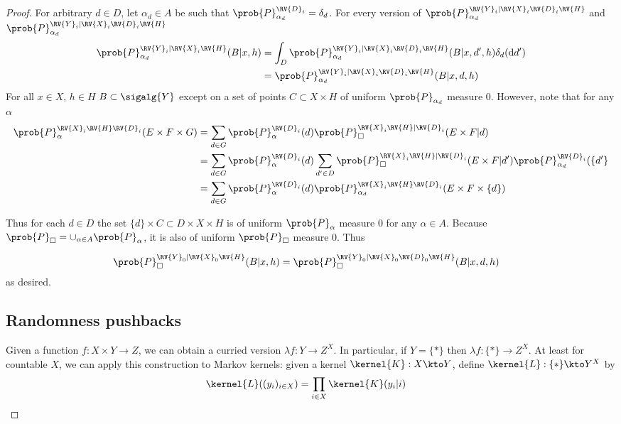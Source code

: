 \begin{proof}
For arbitrary $d\in D$, let $\alpha_d\in A$ be such that $\prob{P}_{\alpha_d}^{\RV{D}_i}=\delta_{d}$. For every version of $\prob{P}_{\alpha_d}^{\RV{Y}_i|\RV{X}_i\RV{D}_i\RV{H}}$ and $\prob{P}_{\alpha_d}^{\RV{Y}_i|\RV{X}_i\RV{D}_i\RV{H}}$
\begin{align}
    \prob{P}_{\alpha_d}^{\RV{Y}_i|\RV{X}_i\RV{H}}(B|x,h) &= \int_{D}\prob{P}_{\alpha_d}^{\RV{Y}_i|\RV{X}_i\RV{D}_i\RV{H}}(B|x,d',h)\delta_d(\mathrm{d}d')\\
                                                         &= \prob{P}_{\alpha_d}^{\RV{Y}_i|\RV{X}_i\RV{D}_i\RV{H}}(B|x,d,h)
\end{align}
For all $x\in X$, $h\in H$ $B\subset\sigalg{Y}$ except on a set of points $C\subset X\times H$ of uniform $\prob{P}_{\alpha_d}$ measure 0.
However, note that for any $\alpha$
\begin{align}
    \prob{P}_\alpha^{\RV{X}_i\RV{H}\RV{D}_i}(E\times F\times G) &= \sum_{d\in G} \prob{P}_\alpha^{\RV{D}_i}(d)\prob{P}_\square^{\RV{X}_i\RV{H}|\RV{D}_i}(E\times F|d)\\
                                                                  &= \sum_{d\in G} \prob{P}_\alpha^{\RV{D}_i}(d)\sum_{d'\in D}\prob{P}_\square^{\RV{X}_i\RV{H}|\RV{D}_i}(E\times F|d')\prob{P}_{\alpha_d}^{\RV{D}_i}(\{d'\}\\
                                                                  &= \sum_{d\in G} \prob{P}_\alpha^{\RV{D}_i}(d)\prob{P}_{\alpha_d}^{\RV{X}_i\RV{H}\RV{D}_i}(E\times F\times\{d\})
\end{align}

Thus for each $d\in D$ the set $\{d\}\times C\subset D\times X\times H$ is of uniform $\prob{P}_\alpha$ measure 0 for any $\alpha\in A$. Because $\prob{P}_\square=\cup_{\alpha\in A}\prob{P}_\alpha$, it is also of uniform $\prob{P}_\square$ measure 0. Thus 

\begin{align}
    \prob{P}_{\square}^{\RV{Y}_0|\RV{X}_0\RV{H}}(B|x,h) &= \prob{P}_{\square}^{\RV{Y}_0|\RV{X}_0\RV{D}_0\RV{H}}(B|x,d,h)
\end{align}
as desired.

\subsection{Randomness pushbacks}

Given a function $f:X\times Y\to Z$, we can obtain a curried version $\lambda f:Y\to Z^X$. In particular, if $Y=\{*\}$ then $\lambda f:\{*\}\to Z^X$. At least for countable $X$, we can apply this construction to Markov kernels: given a kernel $\kernel{K}:X\kto Y$, define $\kernel{L}: \{*\}\kto Y^X$ by 
\begin{align}
    \kernel{L} ((y_i)_{i\in X}) &= \prod_{i\in X} \kernel{K}(y_i|i)
\end{align}


\end{proof}
